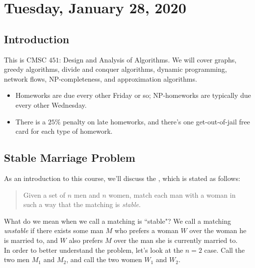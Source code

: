 \section{Tuesday, January 28, 2020}

\subsection{Introduction}

This is CMSC $451$: Design and Analysis of Algorithms. We will cover graphs, greedy algorithms, divide and conquer algorithms, dynamic programming, network flows, NP-completeness, and approximation algorithms.


\begin{itemize}
    \item Homeworks are due every other Friday or so; NP-homeworks are typically due every other Wednesday.
    \item There is a $25\%$ penalty on late homeworks, and there's one get-out-of-jail free card for each type of homework.
\end{itemize}

\subsection{Stable Marriage Problem}

As an introduction to this course, we'll discuss the , which is stated as follows:

\begin{quote}
    Given a set of $n$ men and $n$ women, match each man with a woman in such a way that the matching is \textit{stable}.
\end{quote}

What do we mean when we call a matching is ``stable"? We call a matching \textit{unstable} if there exists some man $M$ who prefers a woman $W$ over the woman he is married to, and $W$ also prefers $M$ over the man she is currently married to. \\



In order to better understand the problem, let's look at the $n = 2$ case. Call the two men $M_1$ and $M_2$, and call the two women $W_1$ and $W_2$.

